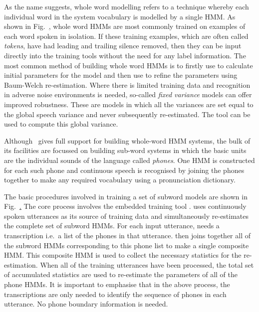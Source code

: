 As the name suggests,  whole word modelling refers to a technique
whereby each individual word in the system vocabulary is modelled by
a  single HMM.  As shown in Fig.~\href{f:isoword}, whole word HMMs
are most commonly trained on examples of each word spoken in
isolation.  If these training examples, which are often called
\textit{tokens}, have had leading and trailing silence removed, then
they can be input directly into the training tools without the need
for any label information. The most common method of building whole
word HMMs is to firstly use
 to calculate initial 
parameters for the model and then
use
 to refine the parameters using Baum-Welch
re-estimation. Where there is limited training data and recognition
in adverse noise environments is needed, so-called {\it fixed
variance} models can offer improved robustness. These are models in
which all the variances are set equal to 
the global speech variance
and never subsequently re-estimated.  The tool
 can be used to 
compute this global variance.


Although \HTK\ gives full support for building whole-word
HMM systems, the bulk of its facilities are focussed on 
building sub-word systems in which the basic units are the
individual sounds of the language called \textit{phones}.
One HMM is constructed for each such phone and 
continuous speech 
is recognised by joining the phones together to 
make any required vocabulary using a pronunciation dictionary.

The basic procedures involved in training a set of subword models
are shown in Fig.~\href{f:subword}.  The core process involves the
embedded training tool 
.   uses 
continuously spoken utterances as its source of training data
and simultaneously re-estimates the complete set of subword HMMs.
For each input utterance,  needs a transcription i.e.\ a list of
the phones in that utterance.   then joins together all of the 
subword HMMs corresponding to this phone list to make a single
composite HMM.  This composite HMM is used to collect
the necessary statistics for the re-estimation.  When all of the
training utterances have been processed, the total set of accumulated
statistics are used to re-estimate the parameters of all of the phone
HMMs. 
It is important to emphasise that in the above process, the transcriptions
are only needed to identify the sequence of phones in each utterance.
No phone boundary information is needed.  

